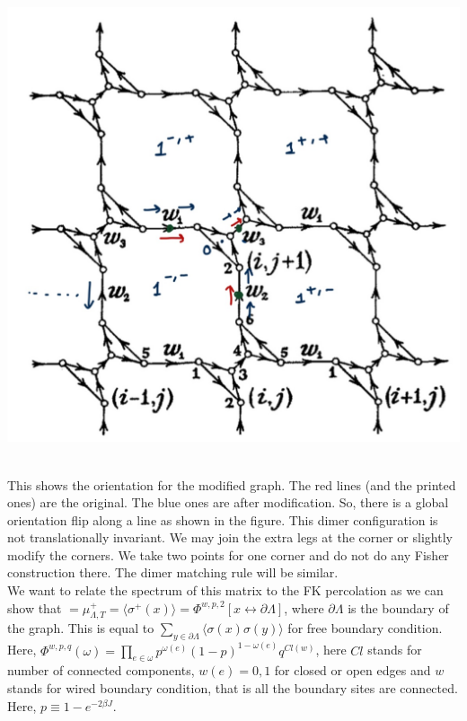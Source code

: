 \documentclass{article}
\begin{document}
	
	\begin{center}
		\includegraphics[scale=0.2]{pfaff mod.jpg}
	\end{center}\\
	
	
	
	This shows the orientation for the modified graph. The red lines (and the printed ones) are the original. The blue ones are after modification. So, there is a global orientation flip along a line as shown in the figure. This dimer configuration is not translationally invariant. We may join the extra legs at the corner or slightly modify the corners. We take two points for one corner and do not do any Fisher construction there. The dimer matching rule will be similar.\\ 
	
	We want to relate the spectrum of this matrix to the FK percolation as we can show that $=\mu^{+}_{\Lambda, T}=\langle{\sigma^{+}(x)}\rangle=\Phi^{w,p,2}[x \leftrightarrow \partial \Lambda ]$, where $\partial \Lambda$ is the boundary of the graph. This is equal to $\sum_{y \in \partial \Lambda} \langle{\sigma(x)\sigma(y)}\rangle$ for free boundary condition.\\
	
	Here, $\Phi^{w,p,q}(\omega)=\prod_{e\in \omega} p^{\omega(e)}(1-p)^{1-\omega(e)}q^{Cl(w)}$, here $Cl$ stands for number of connected components, $w(e)=0,1$ for closed or open edges and $w$ stands for wired boundary condition, that is all the boundary sites are connected. Here, $p \equiv 1-e^{-2\beta J}$.\\
	
\end{document}
